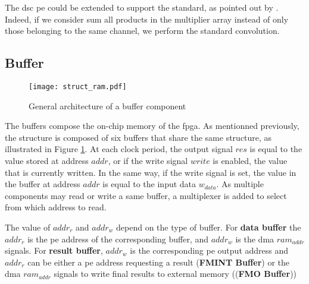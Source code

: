 The \acrshort{dsc} \acrshort{pe} could be extended to support the standard, as pointed out by \textcite{bai_cnn_2018}. Indeed, if we consider sum all products in the multiplier array instead of only those belonging to the same channel, we perform the standard convolution.
%
\subsection{Buffer}
%
\begin{figure}
    \centering
    \texttt{[image: struct\_ram.pdf]}
    \caption{General architecture of a buffer component}
    \label{fig:struct_ram}
\end{figure}
%
The buffers compose the on-chip memory of the \acrshort{fpga}. As mentionned previously, the structure is composed of six buffers that share the same structure, as illustrated in Figure \ref{fig:struct_ram}. At each clock period, the output signal $res$ is equal to the value stored at address $addr$, or if the write signal $write$ is enabled, the value that is currently written. In the same way, if the write signal is set, the value in the buffer at address $addr$ is equal to the input data $w_{data}$. As multiple components may read or write a same buffer, a multiplexer is added to select from which address to read.

The value of $addr_r$ and $addr_w$ depend on the type of buffer. For \textbf{data buffer} the $addr_r$ is the \acrshort{pe} address of the corresponding buffer, and $addr_w$ is the \acrshort{dma} $ram_{addr}$ signals. For \textbf{result buffer}, $addr_w$ is the corresponding \acrshort{pe} output address and $addr_r$ can be either a \acrshort{pe} address requesting a result (\textbf{FMINT Buffer}) or the \acrshort{dma} $ram_{addr}$ signals to write final results to external memory ((\textbf{FMO Buffer}))

